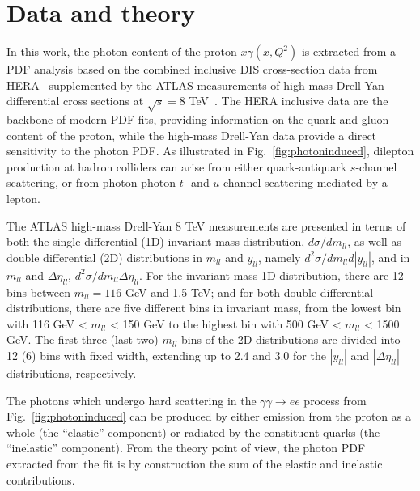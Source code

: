 \section{Data and theory}
\label{sec:theory}

In this work, the photon content of the proton $x\gamma(x,Q^2)$ is
extracted from a PDF analysis based on the combined inclusive DIS
cross-section data from HERA~\cite{Abramowicz:2015mha}
supplemented by the ATLAS measurements of high-mass Drell-Yan
differential cross sections at $\sqrt{s}=8$ TeV~\cite{Aad:2016zzw}.
%
The HERA inclusive data are the backbone of modern PDF fits, providing
information on the quark and gluon content of the proton, while
the high-mass Drell-Yan data provide a direct sensitivity to the
photon PDF.
%
As illustrated in Fig.~\ref{fig:photoninduced}, 
 dilepton production at hadron colliders can arise
from either quark-antiquark $s$-channel scattering, or from
photon-photon $t$- and $u$-channel scattering mediated by a lepton.

The ATLAS high-mass Drell-Yan 8 TeV measurements are presented in terms
of both the
single-differential (1D) invariant-mass distribution,
$d\sigma/dm_{ll}$, as well as double\- differential (2D)
distributions in $m_{ll}$ and $y_{ll}$, namely\-
$d^{2}\sigma/dm_{ll}d|y_{ll}|$, and in $m_{ll}$ and $\Delta\eta_{ll}$,
$d^{2}\sigma/dm_{ll}\Delta\eta_{ll}$.
%
For the invariant-mass 1D distribution, there are 12 bins between $m_{ll}=116$ GeV
and 1.5 TeV; and for both double-differential distributions,
there are five different bins in invariant mass,
from the lowest bin with 116 GeV < $m_{ll}$ <
150 GeV to the highest bin with 500 GeV < $m_{ll}$ < 1500 GeV.
The first three (last two) $m_{ll}$ bins of the 2D distributions are divided into 12 (6) bins
with fixed width, extending up to 2.4 and 3.0 for the $|y_{ll}|$
and $|\Delta\eta_{ll}|$ distributions, respectively.
%

The photons which undergo hard scattering in the
$\gamma\gamma \to ee$  process from Fig.~\ref{fig:photoninduced}
can be produced by either  emission from the
proton as a whole (the ``elastic'' component) or radiated by the constituent quarks
(the ``inelastic'' component).
%
 From the theory point of view, the photon PDF extracted from the
 fit is by construction the sum of the elastic and inelastic contributions.

